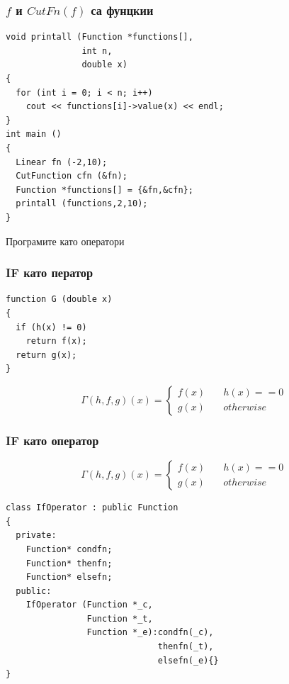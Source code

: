 \documentclass{beamer}
\begin{document}
\begin{frame}[fragile]
\frametitle{$f$ и $CutFn(f)$ са фунцкии}


\begin{flushleft}
\begin{lstlisting}
void printall (Function *functions[],
               int n, 
               double x)
{
  for (int i = 0; i < n; i++)
    cout << functions[i]->value(x) << endl;
}
int main ()
{
  Linear fn (-2,10);
  CutFunction cfn (&fn);
  Function *functions[] = {&fn,&cfn};
  printall (functions,2,10);
}
\end{lstlisting}
  
\end{flushleft}
\end{frame}


\begin{frame}
\centerline{Програмите като оператори}
\end{frame}


\begin{frame}[fragile]
\frametitle{IF като ператор}

\begin{center}

\begin{lstlisting}
function G (double x)
{
  if (h(x) != 0)
    return f(x);
  return g(x);
}
\end{lstlisting}
  
\end{center}


$$
\Gamma(h,f,g)(x) = \left\{
        \begin{array}{ll}
            f(x) & \quad h(x) == 0 \\
            g(x) & \quad otherwise
        \end{array}
    \right.
$$



\end{frame}




\begin{frame}[fragile]
\frametitle{IF като оператор}

\begin{center}
$$
\Gamma(h,f,g)(x) = \left\{
        \begin{array}{ll}
            f(x) & \quad h(x) == 0 \\
            g(x) & \quad otherwise
        \end{array}
    \right.
$$


\begin{lstlisting}
class IfOperator : public Function
{
  private:
    Function* condfn;
    Function* thenfn;
    Function* elsefn;
  public:
    IfOperator (Function *_c, 
                Function *_t,
                Function *_e):condfn(_c),
                              thenfn(_t),
                              elsefn(_e){}
}
\end{lstlisting}
  
\end{center}


\end{frame}
\end{document}
